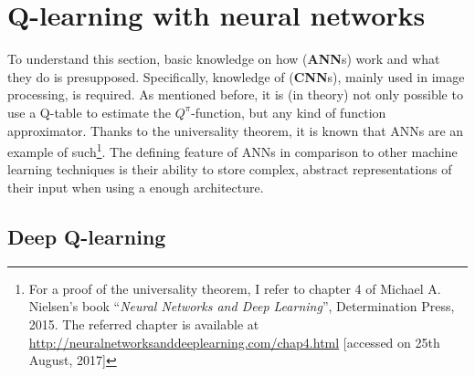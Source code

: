 %


\section{Q-learning with neural networks}

To understand this section, basic knowledge on how  (\textbf{ANN}s) work and what they do is presupposed. Specifically, knowledge of  (\textbf{CNN}s)\cite{yann_lecun_gradient-based_1998}, mainly used in image processing, is required. As mentioned before, it is (in theory) not only possible to use a Q-table to estimate the $Q^\pi$-function, but any kind of function approximator. Thanks to the universality theorem, it is known that ANNs are an example of such\footnote{For a proof of the universality theorem, I refer to chapter 4 of Michael A. Nielsen's book ``\textit{Neural Networks and Deep Learning}'', Determination Press, 2015. The referred chapter is available at \url{http://neuralnetworksanddeeplearning.com/chap4.html} [accessed on 25th August, 2017]}. The defining feature of ANNs in comparison to other machine learning techniques is their ability to store complex, abstract representations of their input when using a  enough architecture.

\subsection{Deep Q-learning} \label{ch:DQN}

